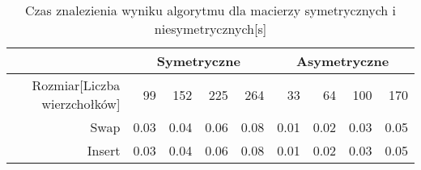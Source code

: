 \begin{table}
\begin{tabular}{|r|r|r|r|r|r|r|r|r|}
\hline
 & \multicolumn{4}{|c|}{Symetryczne} & \multicolumn{4}{|c|}{Asymetryczne} \\ \hline\
Rozmiar[Liczba wierzchołków] & 99 & 152 & 225 & 264 & 33 & 64 & 100 & 170 \\ \hline
Swap & 0.03 & 0.04 & 0.06 & 0.08 & 0.01 & 0.02 & 0.03 & 0.05 \\
Insert & 0.03 & 0.04 & 0.06 & 0.08 & 0.01 & 0.02 & 0.03 & 0.05 \\ \hline
\end{tabular}
\caption{Czas znalezienia wyniku algorytmu dla macierzy symetrycznych i niesymetrycznych[s]}
\label{tab:time_AnStartVal}
\end{table}
